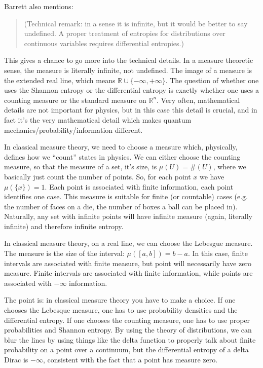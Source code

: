 \documentclass[11pt]{article}
\begin{document}
Barrett also mentions:
\begin{quote}
(Technical remark: in a sense it is infinite, but it would be better to say
undefined. A proper treatment of entropies for distributions over continuous
variables requires differential entropies.)
\end{quote}
This gives a chance to go more into the technical details. In a measure theoretic sense, the measure is literally infinite, not undefined. The image of a measure is the extended real line, which means $\mathbb{R} \cup \{-\infty, +\infty\}$. The question of whether one uses the Shannon entropy or the differential entropy is exactly whether one uses a counting measure or the standard measure on $\mathbb{R}^n$. Very often, mathematical details are not important for physics, but in this case this detail is crucial, and in fact it's the very mathematical detail which makes quantum mechanics/probability/information different.

In classical measure theory, we need to choose a measure which, physically, defines how we ``count'' states in physics. We can either choose the counting measure, so that the measure of a set, it's size, is $\mu(U) = \#(U)$, where we basically just count the number of points. So, for each point $x$ we have $\mu(\{x\}) = 1$. Each point is associated with finite information, each point identifies one case. This measure is suitable for finite (or countable) cases (e.g. the number of faces on a die, the number of boxes a ball can be placed in). Naturally, any set with infinite points will have infinite measure (again, literally infinite) and therefore infinite entropy.

In classical measure theory, on a real line, we can choose the Lebesgue measure. The measure is the size of the interval: $\mu([a, b]) = b-a$. In this case, finite intervals are associated with finite measure, but point will necessarily have zero measure. Finite intervals are associated with finite information, while points are associated with $-\infty$ information.

The point is: in classical measure theory you have to make a choice. If one chooses the Lebesque measure, one has to use probability densities and the differential entropy. If one chooses the counting measure, one has to use proper probabilities and Shannon entropy. By using the theory of distributions, we can blur the lines by using things like the delta function to properly talk about finite probability on a point over a continuum, but the differential entropy of a delta Dirac is $-\infty$, consistent with the fact that a point has measure zero.
\end{document}
